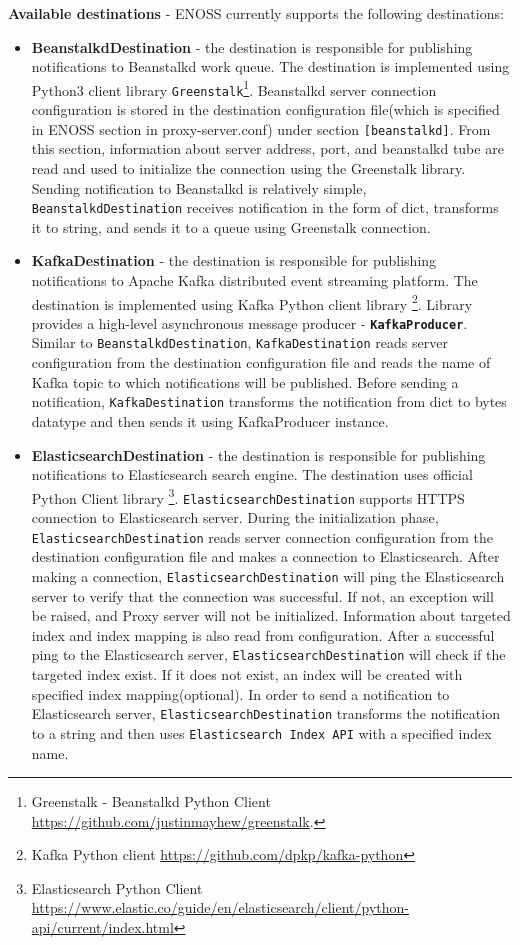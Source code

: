     \textbf{Available destinations} - ENOSS currently supports the following destinations:
    \begin{itemize}
        \item \textbf{BeanstalkdDestination} - the destination is responsible for publishing notifications to Beanstalkd work queue. The destination is implemented using Python3 client library \texttt{Greenstalk}\footnote{Greenstalk - Beanstalkd Python Client \url{https://github.com/justinmayhew/greenstalk}.}. Beanstalkd server connection configuration is stored in the destination configuration file(which is specified in ENOSS section in proxy-server.conf) under section \texttt{[beanstalkd]}. From this section, information about server address, port, and beanstalkd tube are read and used to initialize the connection using the Greenstalk library. Sending notification to Beanstalkd is relatively simple, \texttt{BeanstalkdDestination} receives notification in the form of dict, transforms it to string, and sends it to a queue using Greenstalk connection.

        \item \textbf{KafkaDestination} - the destination is responsible for publishing notifications to Apache Kafka distributed event streaming platform. The destination is implemented using Kafka Python client library \footnote{Kafka Python client \url{https://github.com/dpkp/kafka-python}}. Library provides a high-level asynchronous message producer - \textbf{\texttt{KafkaProducer}}. Similar to \texttt{BeanstalkdDestination}, \texttt{KafkaDestination} reads server configuration from the destination configuration file and reads the name of Kafka topic to which notifications will be published. Before sending a notification, \texttt{KafkaDestination} transforms the notification from dict to bytes datatype and then sends it using KafkaProducer instance.

        \item \textbf{ElasticsearchDestination} - the destination is responsible for publishing notifications to Elasticsearch search engine. The destination uses official Python Client library \footnote{Elasticsearch Python Client \url{https://www.elastic.co/guide/en/elasticsearch/client/python-api/current/index.html}}. \texttt{ElasticsearchDestination} supports HTTPS connection to Elasticsearch server. During the initialization phase, \texttt{ElasticsearchDestination} reads server connection configuration from the destination configuration file and makes a connection to Elasticsearch. After making a connection, \texttt{ElasticsearchDestination} will ping the Elasticsearch server to verify that the connection was successful. If not, an exception will be raised, and Proxy server will not be initialized. Information about targeted index and index mapping is also read from configuration. After a successful ping to the Elasticsearch server, \texttt{ElasticsearchDestination} will check if the targeted index exist. If it does not exist, an index will be created with specified index mapping(optional). In order to send a notification to Elasticsearch server, \texttt{ElasticsearchDestination} transforms the notification to a string and then uses \texttt{Elasticsearch Index API} with a specified index name.
    \end{itemize}

